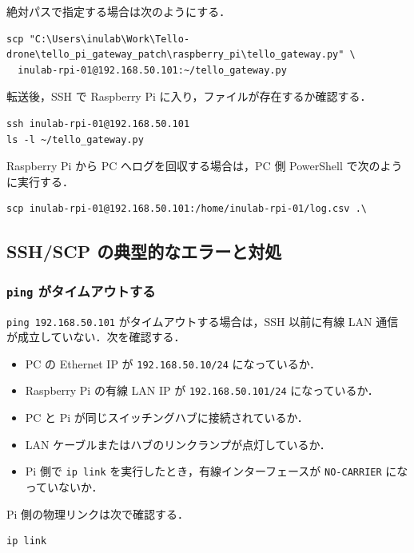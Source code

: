 絶対パスで指定する場合は次のようにする．

\begin{lstlisting}
scp "C:\Users\inulab\Work\Tello-drone\tello_pi_gateway_patch\raspberry_pi\tello_gateway.py" \
  inulab-rpi-01@192.168.50.101:~/tello_gateway.py
\end{lstlisting}

転送後，SSH で Raspberry Pi に入り，ファイルが存在するか確認する．

\begin{lstlisting}
ssh inulab-rpi-01@192.168.50.101
ls -l ~/tello_gateway.py
\end{lstlisting}

Raspberry Pi から PC へログを回収する場合は，PC 側 PowerShell で次のように実行する．

\begin{lstlisting}
scp inulab-rpi-01@192.168.50.101:/home/inulab-rpi-01/log.csv .\
\end{lstlisting}

\subsection{SSH/SCP の典型的なエラーと対処}

\subsubsection{\texttt{ping} がタイムアウトする}

\texttt{ping 192.168.50.101} がタイムアウトする場合は，SSH 以前に有線 LAN 通信が成立していない．次を確認する．

\begin{itemize}
  \item PC の Ethernet IP が \texttt{192.168.50.10/24} になっているか．
  \item Raspberry Pi の有線 LAN IP が \texttt{192.168.50.101/24} になっているか．
  \item PC と Pi が同じスイッチングハブに接続されているか．
  \item LAN ケーブルまたはハブのリンクランプが点灯しているか．
  \item Pi 側で \texttt{ip link} を実行したとき，有線インターフェースが \texttt{NO-CARRIER} になっていないか．
\end{itemize}

Pi 側の物理リンクは次で確認する．

\begin{lstlisting}
ip link
\end{lstlisting}

